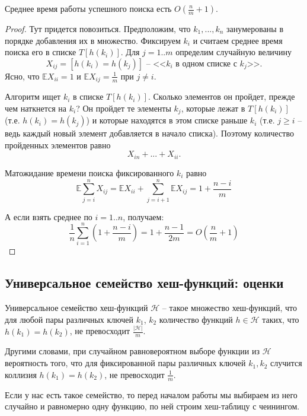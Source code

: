 \begin{theorem*}
	Среднее время работы успешного поиска есть $O\left(\frac{n}{m}+1\right)$.
\end{theorem*}
\begin{proof}
Тут придется повозиться. Предположим, что $k_1, ..., k_n$ занумерованы в порядке добавления их в множество. Фиксируем $k_i$ и считаем среднее время поиска его в списке $T[h(k_i)]$. Для $j=1..m$ определим случайную величину $$X_{ij} = [h(k_i) = h(k_j)] \text{ -- <<$k_i$ в одном списке с $k_j$>>.}$$ Ясно, что $\mathbb E X_{ii} = 1$ и $\mathbb E X_{ij} = \frac{1}{m}$ при $j\neq i$. 

Алгоритм ищет $k_i$ в списке $T[h(k_i)]$. Сколько элементов он пройдет, прежде чем наткнется на $k_i$? Он пройдет те элементы $k_j$, которые лежат в $T[h(k_i)]$ (т.е. $h(k_i)=h(k_j)$) и которые находятся в этом списке раньше $k_i$ (т.е. $j\geq i$ -- ведь каждый новый элемент добавляется в начало списка). Поэтому количество пройденных элементов равно $$X_{in} + ... + X_{ii}.$$

Матожидание времени поиска фиксированного $k_i$ равно $$\mathbb E \sum_{j=i}^n X_{ij} = \mathbb E X_{ii} + \sum_{j=i+1}^n \mathbb E X_{ij} = 1 + \frac{n-i}{m}$$

А если взять среднее по $i=1..n$, получаем: $$\frac{1}{n} \sum_{i=1}^n\left(1+\frac{n-i}{m}\right) = 1 + \frac{n-1}{2m} = O\left(\frac{n}{m} + 1\right)$$
\end{proof}

\subsection{Универсальное семейство хеш-функций: оценки}

\begin{definition*}
	Универсальное семейство хеш-функций $\mathcal{H}$ -- такое множество хеш-функций, что для любой пары различных ключей $k_1$, $k_2$ количество функций $h \in \mathcal{H}$ таких, что $h(k_1) = h(k_2)$, не превосходит $\frac{|\mathcal{H}|}{m}$.
\end{definition*}

 Другими словами, при случайном равновероятном выборе функции из $\mathcal{H}$ вероятность того, что для фиксированной пары различных ключей $k_1, k_2$ случится коллизия $h(k_1) = h(k_2)$, не превосходит $\frac{1}{m}$.

Если у нас есть такое семейство, то перед началом работы мы выбираем из него случайно и равномерно одну функцию, по ней строим хеш-таблицу с чеинингом.


